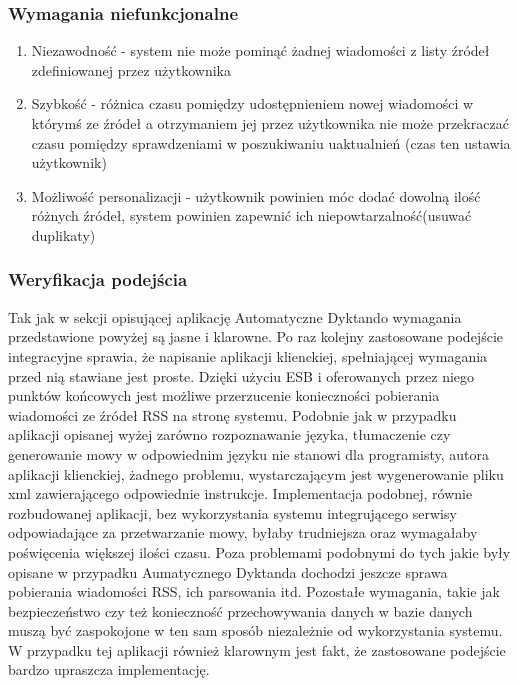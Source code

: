 \subsubsection{Wymagania niefunkcjonalne}
\begin{enumerate}
	\item Niezawodność - system nie może pominąć żadnej wiadomości z listy źródeł zdefiniowanej przez użytkownika
	\item Szybkość - różnica czasu pomiędzy udostępnieniem nowej wiadomości w którymś ze źródeł a otrzymaniem jej przez użytkownika nie może przekraczać czasu pomiędzy sprawdzeniami w poszukiwaniu uaktualnień (czas ten ustawia użytkownik)
	\item Możliwość personalizacji - użytkownik powinien móc dodać dowolną ilość różnych źródeł, system powinien zapewnić ich niepowtarzalność(usuwać duplikaty)
\end{enumerate}

\subsubsection{Weryfikacja podejścia}
Tak jak w sekcji opisującej aplikację Automatyczne Dyktando wymagania przedstawione powyżej są jasne i klarowne. Po raz kolejny zastosowane podejście integracyjne sprawia, że napisanie aplikacji klienckiej, spełniającej wymagania przed nią stawiane jest proste. Dzięki użyciu ESB i oferowanych przez niego punktów końcowych jest możliwe przerzucenie konieczności pobierania wiadomości ze źródeł RSS na stronę systemu. Podobnie jak w przypadku aplikacji opisanej wyżej zarówno rozpoznawanie języka, tłumaczenie czy generowanie mowy w odpowiednim języku nie stanowi dla programisty, autora aplikacji klienckiej, żadnego problemu, wystarczającym jest wygenerowanie pliku xml zawierającego odpowiednie instrukcje. Implementacja podobnej, równie rozbudowanej aplikacji, bez wykorzystania systemu integrującego serwisy odpowiadające za przetwarzanie mowy, byłaby trudniejsza oraz wymagałaby poświęcenia większej ilości czasu. Poza problemami podobnymi do tych jakie były opisane w przypadku Aumatycznego Dyktanda dochodzi jeszcze sprawa pobierania wiadomości RSS, ich parsowania itd. Pozostałe wymagania, takie jak bezpieczeństwo czy też konieczność przechowywania danych w bazie danych muszą być zaspokojone w ten sam sposób niezależnie od wykorzystania systemu. \\
W przypadku tej aplikacji również klarownym jest fakt, że zastosowane podejście bardzo upraszcza implementację.

